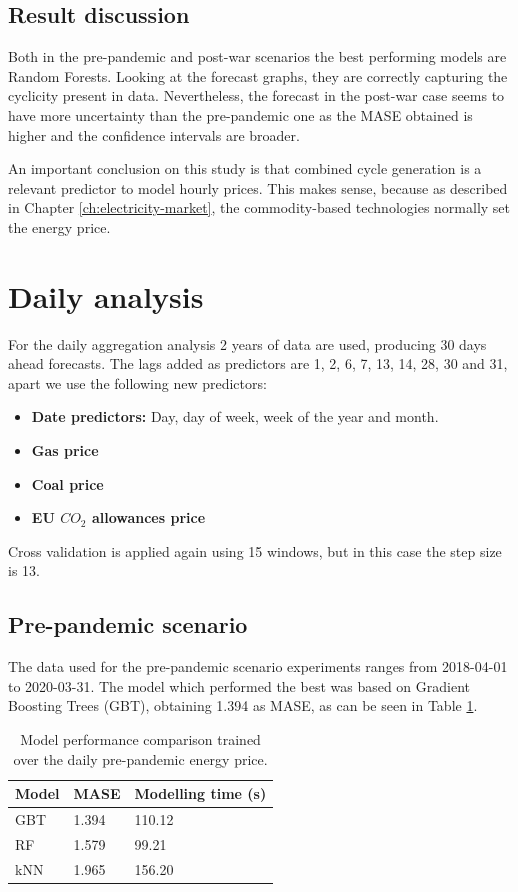 \subsection{Result discussion}
Both in the pre-pandemic and post-war scenarios the best performing models are Random Forests. Looking at the forecast graphs, they are correctly capturing the cyclicity present in data. Nevertheless, the forecast in the post-war case seems to have more uncertainty than the pre-pandemic one as the MASE obtained is higher and the confidence intervals are broader.

An important conclusion on this study is that combined cycle generation is a relevant predictor to model hourly prices. This makes sense, because as described in Chapter \ref{ch:electricity-market}, the commodity-based technologies normally set the energy price.

\newpage
\section{Daily analysis}
For the daily aggregation analysis 2 years of data are used, producing 30 days ahead forecasts. The lags added as predictors are 1, 2, 6, 7, 13, 14, 28, 30 and 31, apart we use the following new predictors:

\begin{itemize}
    \item \textbf{Date predictors:} Day, day of week, week of the year and month.
    \item \textbf{Gas price}
    \item \textbf{Coal price}
    \item \textbf{EU $CO_2$ allowances price}
\end{itemize}

\noindent Cross validation is applied again using 15 windows, but in this case the step size is 13.

\subsection{Pre-pandemic scenario}
The data used for the pre-pandemic scenario experiments ranges from 2018-04-01 to 2020-03-31. The model which performed the best was based on Gradient Boosting Trees (GBT), obtaining 1.394 as MASE, as can be seen in Table \ref{tab:cv-daily-prep}.

\begin{table}[H]
\centering
\begin{tabular}{@{}l|l|l@{}}
\toprule
Model & MASE  & Modelling time (s)  \\ \midrule
GBT   & 1.394 & 110.12 \\
RF    & 1.579 & 99.21  \\
kNN   & 1.965 & 156.20 \\ \bottomrule
\end{tabular}
\caption{Model performance comparison trained over the daily pre-pandemic energy price.}
\label{tab:cv-daily-prep}
\end{table}

